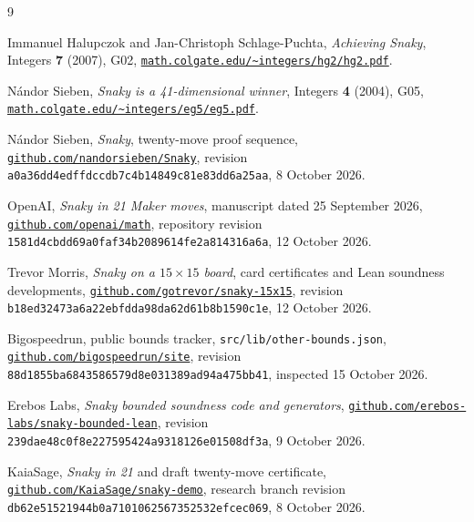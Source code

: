 \documentclass[11pt]{amsart}
\begin{document}
\begin{thebibliography}{9}
\raggedright
{}
Immanuel Halupczok and Jan-Christoph Schlage-Puchta, \emph{Achieving Snaky},
Integers \textbf{7} (2007), G02,
\href{https://math.colgate.edu/~integers/hg2/hg2.pdf}{\nolinkurl{math.colgate.edu/~integers/hg2/hg2.pdf}}.

N\'andor Sieben, \emph{Snaky is a 41-dimensional winner}, Integers \textbf{4}
(2004), G05,
\href{https://math.colgate.edu/~integers/eg5/eg5.pdf}{\nolinkurl{math.colgate.edu/~integers/eg5/eg5.pdf}}.

N\'andor Sieben, \emph{Snaky}, twenty-move proof sequence,
\href{https://github.com/nandorsieben/Snaky/tree/a0a36dd4edffdccdb7c4b14849c81e83dd6a25aa}{\nolinkurl{github.com/nandorsieben/Snaky}},
revision \texttt{a0a36dd4edffdccdb7c4b14849c81e83dd6a25aa}, 8 October 2026.

OpenAI, \emph{Snaky in 21 Maker moves}, manuscript dated 25 September 2026,
\href{https://github.com/openai/math/tree/1581d4cbdd69a0faf34b2089614fe2a814316a6a}{\nolinkurl{github.com/openai/math}},
repository revision \texttt{1581d4cbdd69a0faf34b2089614fe2a814316a6a},
12 October 2026.

Trevor Morris, \emph{Snaky on a $15\times15$ board}, card certificates and Lean
soundness developments,
\href{https://github.com/gotrevor/snaky-15x15/tree/b18ed32473a6a22ebfdda98da62d61b8b1590c1e}{\nolinkurl{github.com/gotrevor/snaky-15x15}},
revision \texttt{b18ed32473a6a22ebfdda98da62d61b8b1590c1e}, 12 October 2026.

Bigospeedrun, public bounds tracker, \nolinkurl{src/lib/other-bounds.json},
\href{https://github.com/bigospeedrun/site/blob/88d1855ba6843586579d8e031389ad94a475bb41/src/lib/other-bounds.json}{\nolinkurl{github.com/bigospeedrun/site}},
revision \texttt{88d1855ba6843586579d8e031389ad94a475bb41}, inspected
15 October 2026.

Erebos Labs, \emph{Snaky bounded soundness code and generators},
\href{https://github.com/erebos-labs/snaky-bounded-lean/tree/239dae48c0f8e227595424a9318126e01508df3a}{\nolinkurl{github.com/erebos-labs/snaky-bounded-lean}},
revision \texttt{239dae48c0f8e227595424a9318126e01508df3a}, 9 October 2026.

KaiaSage, \emph{Snaky in 21} and draft twenty-move certificate,
\href{https://github.com/KaiaSage/snaky-demo/tree/db62e51521944b0a7101062567352532efcec069/research/snaky20}{\nolinkurl{github.com/KaiaSage/snaky-demo}},
research branch revision \texttt{db62e51521944b0a7101062567352532efcec069},
8 October 2026.
\end{thebibliography}
\end{document}
